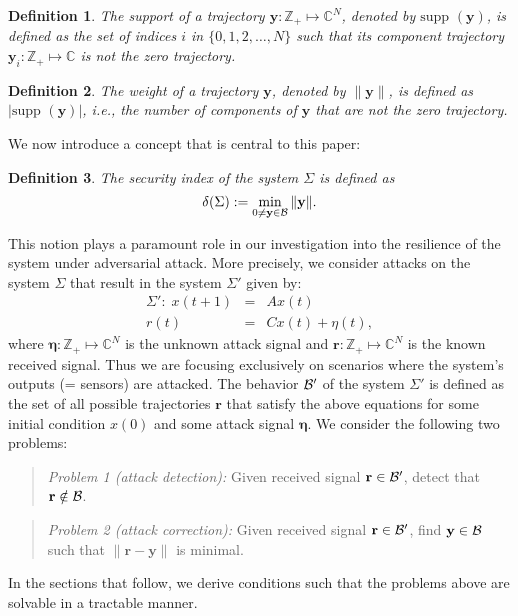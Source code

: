 \documentclass[letterpaper, 10 pt, conference]{ieeeconf}
\newcommand{\B}{{\cal B}}
\newcommand{\supp}{\mbox{supp }}
\newcommand{\ybold}{\mathbf{y}}
\newcommand{\etabold}{\mathbf{\boldsymbol{\eta}}}
\newcommand{\rbold}{\mathbf{r}}
\newtheorem{definition}{Definition}[section]
\begin{document}
\begin{definition} \label{def:supp_y_trajectory} The {\em support} of a trajectory $\ybold:\mathbb{Z}_+ \mapsto \mathbb{C}^N$, denoted by $\supp(\ybold)$, is defined as the set of indices $i$ in $\{ 0, 1, 2, \ldots , N\}$ such that its component trajectory $\ybold_i:\mathbb{Z}_+ \mapsto \mathbb{C}$ is not the zero trajectory. 
\end{definition}
\begin{definition} The {\em weight} of a trajectory $\ybold$, denoted by $\|\ybold\|$, is defined as $|\supp(\ybold)|$, i.e., the number of components of $\ybold$ that are not the zero trajectory.
\end{definition}

We now introduce a concept that is central to this paper:
\begin{definition}\label{def_security} The {\em security index} of the system $\Sigma$ is defined as 
\[
\delta (\Sigma ) := \min _{0\neq \ybold \in \B} \|\ybold\| .
\]
\end{definition}
This notion plays a paramount role in our investigation into the resilience of the system under adversarial attack. More precisely, we consider attacks on the system $\Sigma$ that result in the system $\Sigma'$ given by:
\begin{eqnarray*}
\Sigma': \; x(t+1) & = &  Ax(t) \\
r(t) & = &  Cx(t) + \eta (t),
\end{eqnarray*}
where $\etabold:\mathbb{Z}_+ \mapsto \mathbb{C}^N$ is the unknown attack signal and $\rbold:\mathbb{Z}_+ \mapsto \mathbb{C}^N$ is the known received signal. Thus we are focusing exclusively on scenarios where the system's outputs (= sensors) are attacked. The behavior $\B'$ of the system $\Sigma'$ is defined as the set of all possible trajectories $\rbold$ that satisfy the above equations for some initial condition $x(0)$ and some attack signal $\etabold$. We consider the following two problems:

\begin{quote}
{\em Problem 1 (attack detection):} Given received signal $\rbold \in \B'$, detect that $\rbold \notin \B$. 
\end{quote}
\begin{quote}
{\em Problem 2 (attack correction):} Given received signal $\rbold\in \B'$, find $\ybold \in \B$ such that $\|\rbold - \ybold\| $ is minimal. 
\end{quote}
In the sections that follow, we derive conditions such that the problems above are solvable in a tractable manner.
\end{document}
